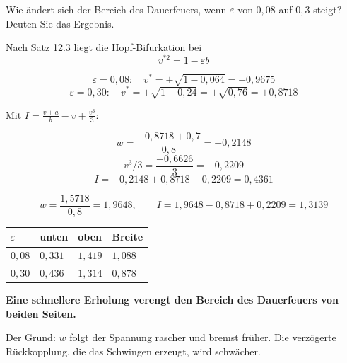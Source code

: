 \begin{aufgabe}
Wie ändert sich der Bereich des Dauerfeuers, wenn $\varepsilon$ von $0{,}08$ auf $0{,}3$ steigt? Deuten Sie das Ergebnis.

\loesung
{}
Nach Satz 12.3 liegt die Hopf-Bifurkation bei
\[ v^{*2} = 1 - \varepsilon b \]

\[ \varepsilon = 0{,}08: \quad v^{*} = \pm\sqrt{1-0{,}064} = \pm 0{,}9675 \]
\[ \varepsilon = 0{,}30: \quad v^{*} = \pm\sqrt{1-0{,}24} = \pm\sqrt{0{,}76} = \pm 0{,}8718 \]

Mit $I = \frac{v+a}{b} - v + \frac{v^3}{3}$:

\[ w = \frac{-0{,}8718+0{,}7}{0{,}8} = -0{,}2148 \]
\[ v^3/3 = \frac{-0{,}6626}{3} = -0{,}2209 \]
\[ I = -0{,}2148 + 0{,}8718 - 0{,}2209 = 0{,}4361 \]

\[ w = \frac{1{,}5718}{0{,}8} = 1{,}9648, \qquad I = 1{,}9648 - 0{,}8718 + 0{,}2209 = 1{,}3139 \]

\begin{center}
\renewcommand{\arraystretch}{1.48}
\begin{tabular}{@{}P{1.8cm}P{2.0cm}P{2.0cm}P{2.0cm}@{}}
\toprule
$\varepsilon$ & \textbf{unten} & \textbf{oben} & \textbf{Breite}\\
\midrule
$0{,}08$ & $0{,}331$ & $1{,}419$ & $1{,}088$\\
$0{,}30$ & $0{,}436$ & $1{,}314$ & $0{,}878$\\
\bottomrule
\end{tabular}
\end{center}

\begin{center}
\begin{minipage}{0.9\textwidth}
\textbf{Eine schnellere Erholung verengt den Bereich des Dauerfeuers von beiden Seiten.}
\end{minipage}
\end{center}

Der Grund: $w$ folgt der Spannung rascher und bremst früher. Die verzögerte Rückkopplung, die das Schwingen erzeugt, wird schwächer.

\begin{center}
\begin{minipage}{0.88\textwidth}
\end{minipage}
\end{center}


\end{aufgabe}
